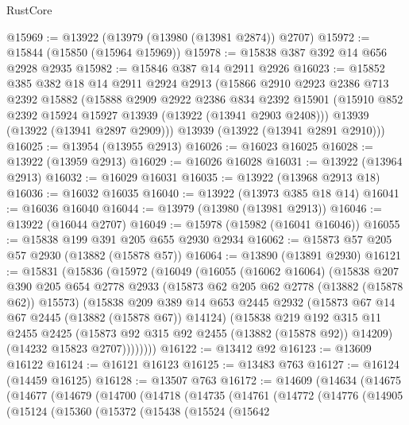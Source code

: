 \begin{lexlean}{RustCore}
\begin{coremodule}
@15969 := @13922 (@13979 (@13980 (@13981 @2874)) @2707)
@15972 := @15844 (@15850 (@15964 @15969))
@15978 := @15838 @387 @392 @14 @656 @2928 @2935
@15982 := @15846 @387 @14 @2911 @2926
@16023 := @15852
    @385
    @382
    @18
    @14
    @2911
    @2924
    @2913
    (@15866
      @2910
      @2923
      @2386
      @713
      @2392
      @15882
      (@15888
        @2909
        @2922
        @2386
        @834
        @2392
        @15901
        (@15910 @852 @2392 @15924 @15927 @13939 (@13922 (@13941 @2903 @2408)))
        @13939
        (@13922 (@13941 @2897 @2909)))
      @13939
      (@13922 (@13941 @2891 @2910)))
@16025 := @13954 (@13955 @2913)
@16026 := @16023 @16025
@16028 := @13922 (@13959 @2913)
@16029 := @16026 @16028
@16031 := @13922 (@13964 @2913)
@16032 := @16029 @16031
@16035 := @13922 (@13968 @2913 @18)
@16036 := @16032 @16035
@16040 := @13922 (@13973 @385 @18 @14)
@16041 := @16036 @16040
@16044 := @13979 (@13980 (@13981 @2913))
@16046 := @13922 (@16044 @2707)
@16049 := @15978 (@15982 (@16041 @16046))
@16055 := @15838 @199 @391 @205 @655 @2930 @2934
@16062 := @15873 @57 @205 @57 @2930 (@13882 (@15878 @57))
@16064 := @13890 (@13891 @2930)
@16121 := @15831
    (@15836
      (@15972
        (@16049
          (@16055
            (@16062 @16064)
            (@15838
              @207
              @390
              @205
              @654
              @2778
              @2933
              (@15873 @62 @205 @62 @2778 (@13882 (@15878 @62)) @15573)
              (@15838
                @209
                @389
                @14
                @653
                @2445
                @2932
                (@15873 @67 @14 @67 @2445 (@13882 (@15878 @67)) @14124)
                (@15838
                  @219
                  @192
                  @315
                  @11
                  @2455
                  @2425
                  (@15873 @92 @315 @92 @2455 (@13882 (@15878 @92)) @14209)
                  (@14232 @15823 @2707))))))))
@16122 := @13412 @92
@16123 := @13609 @16122
@16124 := @16121 @16123
@16125 := @13483 @763
@16127 := @16124 (@14459 @16125)
@16128 := @13507 @763
@16172 := @14609
    (@14634
      (@14675
        (@14677
          (@14679
            (@14700
              (@14718
                (@14735
                  (@14761
                    (@14772
                      (@14776
                        (@14905
                          (@15124
                            (@15360
                              (@15372
                                (@15438
                                  (@15524
                                    (@15642

\end{coremodule}
\end{lexlean}
